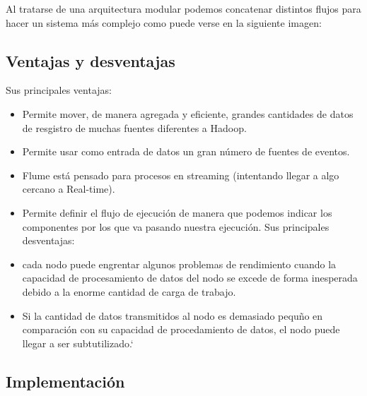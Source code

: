 \documentclass[]{article}
\begin{document}
Al tratarse de una arquitectura modular podemos concatenar distintos
flujos para hacer un sistema más complejo como puede verse en la
siguiente imagen:

\subsection{Ventajas y desventajas}\label{ventajas-y-desventajas}

Sus principales ventajas:

\begin{itemize}
\itemsep1pt\parskip0pt
\item
  Permite mover, de manera agregada y eficiente, grandes cantidades de
  datos de resgistro de muchas fuentes diferentes a Hadoop.
\item
  Permite usar como entrada de datos un gran número de fuentes de
  eventos.
\item
  Flume está pensado para procesos en streaming (intentando llegar a
  algo cercano a Real-time).
\item
  Permite definir el flujo de ejecución de manera que podemos indicar
  los componentes por los que va pasando nuestra ejecución. Sus
  principales desventajas:
\item
  cada nodo puede engrentar algunos problemas de rendimiento cuando la
  capacidad de procesamiento de datos del nodo se excede de forma
  inesperada debido a la enorme cantidad de carga de trabajo.
\item
  Si la cantidad de datos transmitidos al nodo es demasiado pequño en
  comparación con su capacidad de procedamiento de datos, el nodo puede
  llegar a ser subtutilizado.`
\end{itemize}

\subsection{Implementación}\label{implementacion-1}
\end{document}
